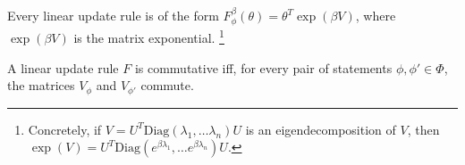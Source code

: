 
\begin{prop}
Every linear update rule is of the form
$
    F^{\beta}_\phi(\theta) =  \theta^{T} \exp(\beta V)
$,
where $\exp(\beta V)$ is the matrix exponential.%
    \footnote{Concretely, if $V = U^T \mathrm{Diag}(\lambda_1, \ldots \lambda_n) U$ is an eigendecomposition of $V$, then $\exp(V) = U^T \mathrm{Diag}(e^{\beta\lambda_1}, \ldots e^{\beta\lambda_n}) U$.}
\end{prop}

\begin{prop}
A linear update rule $F$ is commutative iff, for every pair of statements  $\phi, \phi' \in \Phi$, the
matrices $V_\phi$ and $V_{\phi'}$ commute.
\end{prop}
